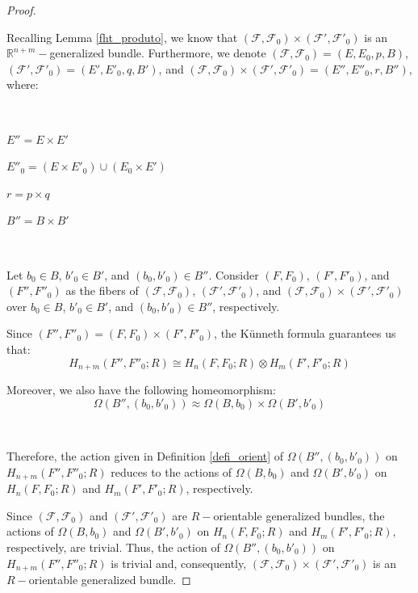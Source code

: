 \documentclass[12pt,oneside]{book}
\newcommand{\R}{\mathbb{R}}
\newcommand{\tensor}{\otimes}
\begin{document}
    \begin{proof}

        \

    	Recalling Lemma \ref{fht_produto}, we know that $(\mathcal{F},\mathcal{F}_{0})\times (\mathcal{F'},\mathcal{F'}_{0})$ is an 
        $\R^{n+m}-$generalized bundle. Furthermore, we denote $(\mathcal{F},\mathcal{F}_{0})=(E,E_{0},p,B)$, 
        $(\mathcal{F'},\mathcal{F'}_{0})=(E',E'_{0},q,B')$, and 
        $(\mathcal{F},\mathcal{F}_{0})\times (\mathcal{F'},\mathcal{F'}_{0})=(E'',E''_{0},r,B'')$, where:

        \

    	$E''=E\times E'$

    	$E''_{0}=\left( E\times E'_{0} \right)\cup \left( E_{0}\times E' \right)$
        
    	$r=p\times q$

    	$B''=B\times B'$

        \

    	Let $b_{0}\in B$, $b'_{0}\in B'$, and $(b_{0},b'_{0})\in B''$. Consider $(F,F_{0})$, $(F',F'_{0})$, and $(F'',F''_{0})$ as the fibers 
        of $(\mathcal{F},\mathcal{F}_{0})$, $(\mathcal{F'},\mathcal{F'}_{0})$, and 
        $(\mathcal{F},\mathcal{F}_{0})\times (\mathcal{F'},\mathcal{F'}_{0})$ over $b_{0}\in B$, $b'_{0}\in B'$, and $(b_{0},b'_{0})\in B''$, 
        respectively.

    	Since $(F'',F''_{0})=(F,F_{0})\times (F',F'_{0})$, the Künneth formula guarantees us that:
    	$$ H_{n+m}(F'',F''_{0};R)\cong H_{n}(F,F_{0};R)\tensor H_{m}(F',F'_{0};R) $$

    	Moreover, we also have the following homeomorphism:
    	$$ \Omega(B'',(b_{0},b'_{0}))\approx \Omega(B,b_{0})\times\Omega(B',b'_{0}) $$

        \

    	Therefore, the action given in Definition \ref{defi_orient} of $\Omega(B'',(b_{0},b'_{0}))$ on $H_{n+m}(F'',F''_{0};R)$ reduces to the 
        actions of $\Omega(B,b_{0})$ and $\Omega(B',b'_{0})$ on $H_{n}(F,F_{0};R)$ and $H_{m}(F',F'_{0};R)$, respectively.

    	Since $(\mathcal{F},\mathcal{F}_{0})$ and $(\mathcal{F'},\mathcal{F'}_{0})$ are $R-$orientable generalized bundles, the actions of 
        $\Omega(B,b_{0})$ and $\Omega(B',b'_{0})$ on $H_{n}(F,F_{0};R)$ and $H_{m}(F',F'_{0};R)$, respectively, are trivial. Thus, the action 
        of $\Omega(B'',(b_{0},b'_{0}))$ on $H_{n+m}(F'',F''_{0};R)$ is trivial and, consequently, 
        $(\mathcal{F},\mathcal{F}_{0})\times (\mathcal{F'},\mathcal{F'}_{0})$ is an $R-$orientable generalized bundle.


\end{proof}
\end{document}
